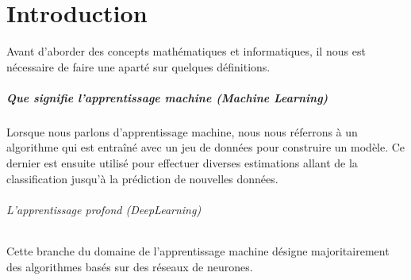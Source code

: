 \chapter{Introduction}
Avant d'aborder des concepts math\'ematiques et informatiques, il nous est n\'ecessaire de faire une apart\'e sur quelques d\'efinitions.

\paragraph{Que signifie l'apprentissage machine (Machine Learning)}
Lorsque nous parlons d'apprentissage machine, nous nous r\'eferrons \`a un algorithme qui est entra\^in\'e avec un jeu de donn\'ees pour construire un mod\`ele.
Ce dernier est ensuite utilis\'e pour effectuer diverses estimations allant de la classification jusqu'\`a la pr\'ediction de nouvelles donn\'ees.

\subparagraph{L'apprentissage profond (DeepLearning)}
Cette branche du domaine de l'apprentissage machine d\'esigne majoritairement des algorithmes basés sur des réseaux de neurones.